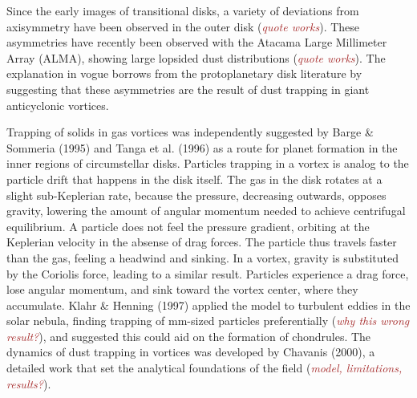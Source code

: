 \documentclass[apj]{emulateapj}
\def\brown#1{\textcolor{brown}{#1}}
\newcommand{\comm}[1]{({\it \brown{#1}})}
\begin{document}

%
% 






% 



Since the early images of transitional disks, a variety of deviations
from axisymmetry have been observed in the outer disk \comm{quote works}. These asymmetries 
have recently been observed with the Atacama Large Millimeter Array
(ALMA), showing large lopsided dust distributions \comm{quote works}. The explanation in
vogue borrows from the protoplanetary disk literature by suggesting that these asymmetries are the
result of dust trapping in giant anticyclonic vortices. 

Trapping of solids in gas vortices was independently suggested
by Barge \& Sommeria (1995) and Tanga et al. (1996) as a route for
planet formation in the inner regions of circumstellar
disks. Particles trapping in a vortex is analog to the particle drift
that happens in the disk
itself. The gas in the disk rotates at a slight sub-Keplerian rate,
because the pressure, decreasing outwards, opposes gravity,
lowering the amount of angular momentum needed to achieve centrifugal
equilibrium. A particle does not feel the pressure gradient, orbiting at
the Keplerian velocity in the absense of drag forces. The particle
thus travels faster than the gas, feeling a
headwind and sinking. In a vortex, gravity is substituted by the
Coriolis force, leading to a similar result. Particles experience a
drag force, lose angular momentum, and sink toward the vortex
center, where they accumulate. Klahr \& Henning (1997) applied the model 
to turbulent eddies in the solar nebula, finding trapping of mm-sized
particles preferentially \comm{why this wrong result?}, and suggested
this could aid on the formation of chondrules. The dynamics of dust
trapping in vortices was developed by Chavanis (2000), a detailed work 
that set the analytical foundations of the field \comm{model,
  limitations, results?}.  
\end{document}
